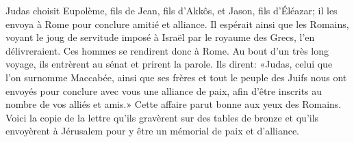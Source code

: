 Judas choisit Eupolème, fils de Jean, fils d’Akkôs, et Jason, fils d’Éléazar;
	il les envoya à Rome pour conclure amitié et alliance.
Il espérait ainsi que les Romains,
	voyant le joug de servitude imposé à Israël par le royaume des Grecs,
	l’en délivreraient.
Ces hommes se rendirent donc à Rome.
Au bout d’un très long voyage, ils entrèrent au sénat et prirent la parole.
	Ils dirent: «Judas, celui que l’on surnomme Maccabée,
	ainsi que ses frères et tout le peuple des Juifs
	nous ont envoyés pour conclure avec vous une alliance de paix,
	afin d’être inscrits au nombre de vos alliés et amis.»
Cette affaire parut bonne aux yeux des Romains.
Voici la copie de la lettre qu’ils gravèrent sur des tables de bronze
	et qu’ils envoyèrent à Jérusalem pour y être un mémorial de paix et d’alliance.
